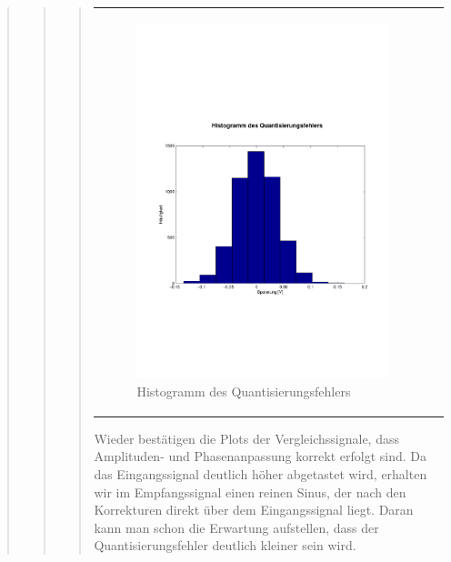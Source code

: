\begin{quote}
\begin{quote}
\begin{quote}
\begin{center}
\begin{tabular}{ll}
                    \begin{minipage}{0.6\textwidth}
                        \begin{figure}[H]
                            \includegraphics[scale=0.4, trim = 0cm 7cm 0cm
                            7.5cm, clip]
                            {./Bilder/sin100_Histogramm}
                              \caption{Histogramm des Quantisierungsfehlers}
                        \end{figure}
                    \end{minipage}
                
                \end{tabular}
            \end{center}
            \vspace{1em}
            
            Wieder bestätigen die Plots der Vergleichssignale, dass Amplituden-
            und Phasenanpassung korrekt erfolgt sind. Da das Eingangssignal
            deutlich höher abgetastet wird, erhalten wir im Empfangssignal einen
            reinen Sinus, der nach den Korrekturen direkt über dem
            Eingangssignal liegt. Daran kann man schon die Erwartung aufstellen,
            dass der Quantisierungsfehler deutlich kleiner sein wird.
            

\end{quote}
\end{quote}
\end{quote}
